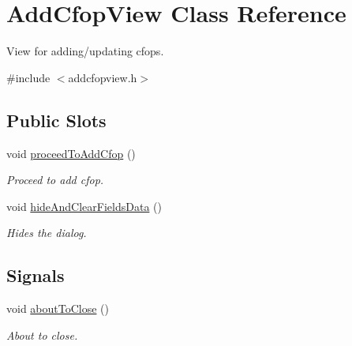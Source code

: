 \hypertarget{class_add_cfop_view}{\section{\-Add\-Cfop\-View \-Class \-Reference}
\label{class_add_cfop_view}
}


\-View for adding/updating cfops.  




{\ttfamily \#include $<$addcfopview.\-h$>$}

\subsection*{\-Public \-Slots}
\begin{DoxyCompactItemize}
\item 
void \hyperlink{class_add_cfop_view_ae0c6511462b44418d3edbeb8fa2497c3}{proceed\-To\-Add\-Cfop} ()
\begin{DoxyCompactList}\small\item\em \-Proceed to add cfop. \end{DoxyCompactList}\item 
void \hyperlink{class_add_cfop_view_a280b1e8a1f5449353efa5a74c134360c}{hide\-And\-Clear\-Fields\-Data} ()
\begin{DoxyCompactList}\small\item\em \-Hides the dialog. \end{DoxyCompactList}\end{DoxyCompactItemize}
\subsection*{\-Signals}
\begin{DoxyCompactItemize}
\item 
void \hyperlink{class_add_cfop_view_a951a7a2e4b93d86cd50bba368ccdd9ac}{about\-To\-Close} ()
\begin{DoxyCompactList}\small\item\em \-About to close. \end{DoxyCompactList}\end{DoxyCompactItemize}
